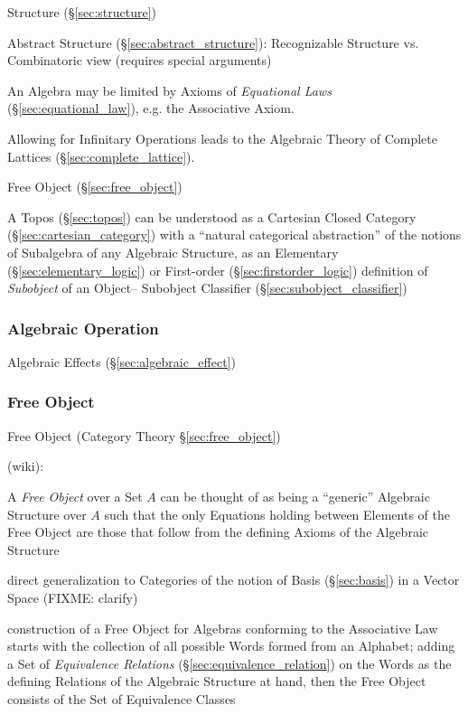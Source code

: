 Structure (\S\ref{sec:structure})

Abstract Structure (\S\ref{sec:abstract_structure}): Recognizable
Structure vs. Combinatoric view (requires special arguments)

An Algebra may be limited by Axioms of \emph{Equational Laws}
(\S\ref{sec:equational_law}), e.g. the Associative Axiom.

Allowing for Infinitary Operations leads to the Algebraic Theory of
Complete Lattices (\S\ref{sec:complete_lattice}).

Free Object (\S\ref{sec:free_object})

\fist A Topos (\S\ref{sec:topos}) can be understood as a Cartesian Closed
Category (\S\ref{sec:cartesian_category}) with a ``natural categorical
abstraction'' of the notions of Subalgebra of any Algebraic Structure, as an
Elementary (\S\ref{sec:elementary_logic}) or First-order
(\S\ref{sec:firstorder_logic}) definition of \emph{Subobject} of an Object--
Subobject Classifier (\S\ref{sec:subobject_classifier})



\subsubsection{Algebraic Operation}\label{sec:algebraic_operation}

Algebraic Effects (\S\ref{sec:algebraic_effect})



\subsubsection{Free Object}\label{sec:universal_free_object}

\fist Free Object (Category Theory \S\ref{sec:free_object})

(wiki):

A \emph{Free Object} over a Set $A$ can be thought of as being a ``generic''
Algebraic Structure over $A$ such that the only Equations holding between
Elements of the Free Object are those that follow from the defining Axioms of
the Algebraic Structure

direct generalization to Categories of the notion of Basis (\S\ref{sec:basis})
in a Vector Space (FIXME: clarify)

construction of a Free Object for Algebras conforming to the Associative Law
starts with the collection of all possible Words formed from an Alphabet;
adding a Set of \emph{Equivalence Relations} (\S\ref{sec:equivalence_relation})
on the Words as the defining Relations of the Algebraic Structure at hand, then
the Free Object consists of the Set of Equivalence Classes



